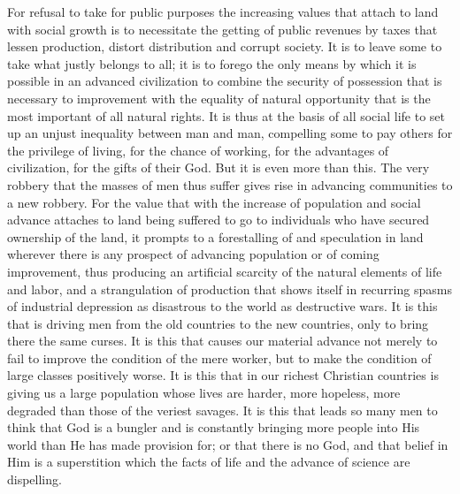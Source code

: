 \documentclass{book}
\begin{document}
For refusal to take for public purposes the increasing values that attach to land with social growth is to necessitate the getting of public revenues by taxes that lessen production, distort distribution and corrupt society. It is to leave some to take what justly belongs to all; it is to forego the only means by which it is possible in an advanced civilization to combine the security of possession that is necessary to improvement with the equality of natural opportunity that is the most important of all natural rights. It is thus at the basis of all social life to set up an unjust inequality between man and man, compelling some to pay others for the privilege of living, for the chance of working, for the advantages of civilization, for the gifts of their God. But it is even more than this. The very robbery that the masses of men thus suffer gives rise in advancing communities to a new robbery. For the value that with the increase of population and social advance attaches to land being suffered to go to individuals who have secured ownership of the land, it prompts to a forestalling of and speculation in land wherever there is any prospect of advancing population or of coming improvement, thus producing an artificial scarcity of the natural elements of life and labor, and a strangulation of production that shows itself in recurring spasms of industrial depression as disastrous to the world as destructive wars. It is this that is driving men from the old countries to the new countries, only to bring there the same curses. It is this that causes our material advance not merely to fail to improve the condition of the mere worker, but to make the condition of large classes positively worse. It is this that in our richest Christian countries is giving us a large population whose lives are harder, more hopeless, more degraded than those of the veriest savages. It is this that leads so many men to think that God is a bungler and is constantly bringing more people into His world than He has made provision for; or that there is no God, and that belief in Him is a superstition which the facts of life and the advance of science are dispelling.
\end{document}
